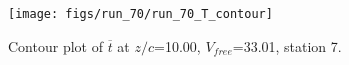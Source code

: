 \begin{figure}[H]
\centering
\texttt{[image: figs/run\_70/run\_70\_T\_contour]}
\caption{Contour plot of $\overline{t}$ at $z/c$=10.00, $V_{free}$=33.01, station 7.}
\end{figure}


